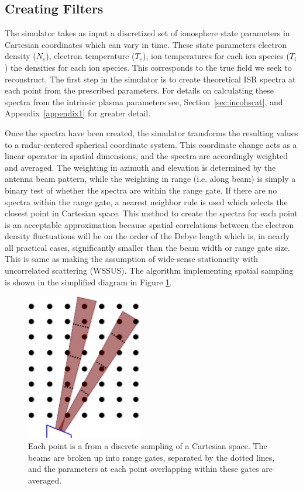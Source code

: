 \subsection{Creating Filters}

The simulator takes as input a discretized set of ionosphere state parameters in Cartesian coordinates which can vary in time. These state parameters electron density ($N_e$), electron temperature ($T_e$), ion temperatures for each ion species ($T_i$) the densities for each ion species. This corresponds to the true field we seek to reconstruct. The first step in the simulator is to create theoretical ISR spectra at each point from the prescribed parameters. For details on calculating these spectra from the intrinsic plasma parameters see, Section~\ref{sec:incohscat}, and Appendix~\ref{appendix1} for greater detail. 

Once the spectra have been created, the simulator transforms the resulting values to a radar-centered spherical coordinate system. This coordinate change acts as a linear operator in spatial dimensions, and the spectra are accordingly weighted and averaged. The weighting in azimuth and elevation is determined by the antenna beam pattern, while the weighting in range (i.e. along beam) is simply a binary test of whether the spectra are within the range gate. If there are no spectra within the range gate, a nearest neighbor rule is used which selects the closest point in Cartesian space. This method to create the spectra for each point is an acceptable approximation because spatial correlations between the electron density fluctuations will be on the order of the Debye length \cite{farley1969} which is, in nearly all practical cases, significantly smaller than the beam width or range gate size. This is same as making the assumption of wide-sense stationarity with uncorrelated scattering (WSSUS)\cite{Kailath:1962jx}. The algorithm implementing spatial sampling is shown in the simplified diagram in Figure \ref{fig:beamdia}.

\begin{figure}[!t]
\centering
\includegraphics[width=2in]{beamsampling}
\caption{Each point is a from a discrete sampling of a Cartesian space. The beams are broken up into range gates, separated by the dotted lines, and the parameters at each point overlapping within these gates are averaged.}
\label{fig:beamdia}
\end{figure}
 
